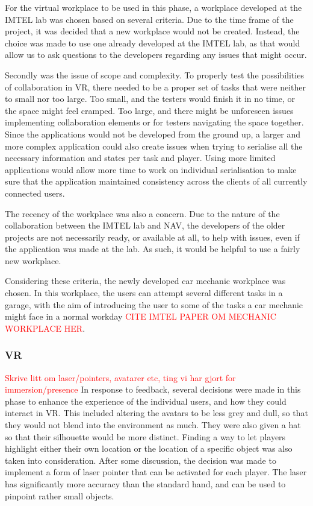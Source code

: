For the virtual workplace to be used in this phase, a workplace developed at the IMTEL lab was chosen based on several criteria. Due to the time frame of the project, it was decided that a new workplace would not be created. Instead, the choice was made to use one already developed at the IMTEL lab, as that would allow us to ask questions to the developers regarding any issues that might occur. 

Secondly was the issue of scope and complexity. To properly test the possibilities of collaboration in VR, there needed to be a proper set of tasks that were neither to small nor too large. Too small, and the testers would finish it in no time, or the space might feel cramped. Too large, and there might be unforeseen issues implementing collaboration elements or for testers navigating the space together. Since the applications would not be developed from the ground up, a larger and more complex application could also create issues when trying to serialise all the necessary information and states per task and player. Using more limited applications would allow more time to work on individual serialisation to make sure that the application maintained consistency across the clients of all currently connected users. 

The recency of the workplace was also a concern. Due to the nature of the collaboration between the IMTEL lab and NAV, the developers of the older projects are not necessarily ready, or available at all, to help with issues, even if the application was made at the lab. As such, it would be helpful to use a fairly new workplace.

Considering these criteria, the newly developed car mechanic workplace was chosen. In this workplace, the users can attempt several different tasks in a garage, with the aim of introducing the user to some of the tasks a car mechanic might face in a normal workday  \textcolor{red}{CITE IMTEL PAPER OM  MECHANIC WORKPLACE HER}.

\subsubsection{VR}
\textcolor{red}{Skrive litt om laser/pointers, avatarer etc, ting vi har gjort for immersion/presence}
In response to feedback, several decisions were made in this phase to enhance the experience of the individual users, and how they could interact in VR. This included altering the avatars to be less grey and dull, so that they would not blend into the environment as much. They were also given a hat so that their silhouette would be more distinct. Finding a way to let players highlight either their own location or the location of a specific object was also taken into consideration. After some discussion, the decision was made to implement a form of laser pointer that can be activated for each player. The laser has significantly more accuracy than the standard hand, and can be used to pinpoint rather small objects. 

